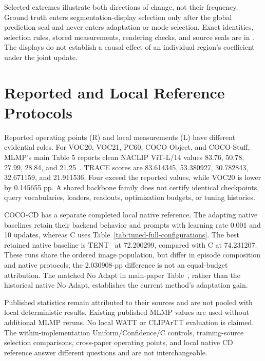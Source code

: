 Selected extremes illustrate both directions of change, not their frequency. Ground truth enters segmentation-display selection only after the global prediction seal and never enters adaptation or mode selection. Exact identities, selection rules, stored measurements, rendering checks, and source seals are in . The displays do not establish a causal effect of an individual region's coefficient under the joint update.

\section{Reported and Local Reference Protocols}
\label{app:native}
Reported operating points (R) and local measurements (L) have different evidential roles. For VOC20, VOC21, PC60, COCO Object, and COCO-Stuff, MLMP's main Table 5 reports clean NACLIP ViT-L/14 values 83.76, 50.78, 27.99, 28.84, and 21.25~\cite{noori2025mlmp}. TRACE scores are 83.614345, 53.380927, 30.782843, 32.671159, and 21.911536. Four exceed the reported values, while VOC20 is lower by 0.145655 pp. A shared backbone family does not certify identical checkpoints, query vocabularies, loaders, readouts, optimization budgets, or tuning histories.

COCO-CD has a separate completed local native reference. The adapting native baselines retain their backend behavior and prompts with learning rate 0.001 and 10 updates, whereas C uses Table~\ref{tab:tuned-full-configurations}. The best retained native baseline is TENT~\cite{wang2021tent} at 72.200299, compared with C at 74.231207. These runs share the ordered image population, but differ in episode composition and native protocols; the 2.030908-pp difference is not an equal-budget attribution. The matched No Adapt in main-paper Table~, rather than the historical native No Adapt, establishes the current method's adaptation gain.

Published statistics remain attributed to their sources and are not pooled with local deterministic results. Existing published MLMP values are used without additional MLMP reruns. No local WATT or CLIPArTT evaluation is claimed. The within-implementation Uniform/Confidence/C controls, training-source selection comparisons, cross-paper operating points, and local native CD reference answer different questions and are not interchangeable.

